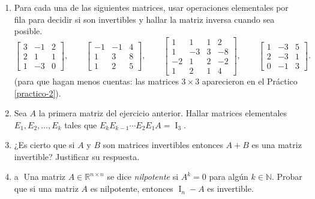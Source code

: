\begin{enumerate}[topsep=6pt,itemsep=.4cm]


\item\label{ej:inversas} Para cada una de las siguientes matrices, usar operaciones elementales
por fila para decidir si son invertibles y hallar la matriz inversa cuando sea posible.
\begin{equation*}
\begin{bmatrix} 3 & -1 & 2 \\ 2 & 1 & 1 \\ 1 & -3 & 0\end{bmatrix},\qquad
\begin{bmatrix} -1 & -1 &4 \\ 1 & 3 & 8 \\ 1 & 2 & 5\end{bmatrix},\qquad
\begin{bmatrix} 1 & 1 & 1 & 2 \\ 1 & -3 & 3 & -8 \\ -2 & 1 & 2 & -2 \\ 1 & 2 & 1 & 4 \end{bmatrix},\qquad
\begin{bmatrix} 1 & -3 & 5 \\ 2 & -3 & 1 \\ 0 & -1 & 3 \end{bmatrix}.
\end{equation*}
(para que hagan menos cuentas: las matrices $3\times3$ aparecieron en el Práctico \ref{practico-2}).


\item Sea $A$ la primera matriz del ejercicio anterior.
Hallar matrices elementales $E_1,E_2,\dots,E_k$ tales que $E_kE_{k-1}\cdots E_2E_1A=\operatorname{I}_3$.


\item\label{suma-de-invertibles} ¿Es cierto que si $A$ y $B$ son matrices invertibles entonces $A+B$ es una matriz invertible? Justificar su respuesta.

\item\label{nilpotene - id} \textcircled{a} Una matriz $A\in\mathbb{R}^{n\times n}$ se dice \emph{nilpotente} si $A^k=0$ para algún $k\in\mathbb{N}$.
Probar que si una matriz $A$ es nilpotente, entonces  $\operatorname{I}_n - A$  es invertible.



\end{enumerate}
